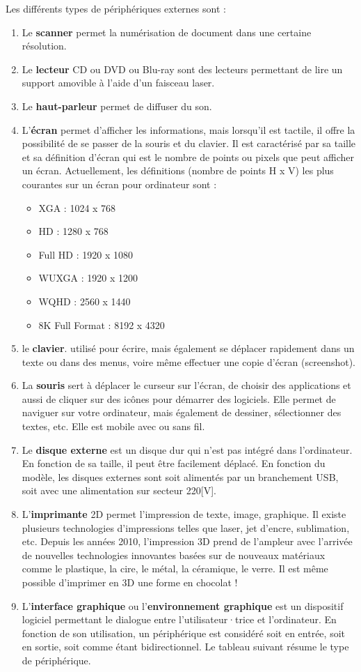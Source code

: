 \documentclass[11pt, a4paper]{book}
\begin{document}
Les différents types de périphériques externes sont :
\begin{enumerate}[1)]
    \item Le {\bf scanner} permet la numérisation de document dans une certaine résolution.
    \item Le {\bf lecteur} CD ou DVD ou Blu-ray sont des lecteurs permettant de lire un support amovible à l’aide d’un faisceau laser.
    \item Le {\bf haut-parleur} permet de diffuser du son.
    \item L’{\bf écran} permet d’afficher les informations, mais lorsqu’il est tactile, il offre la possibilité de se passer de la souris et du clavier. Il est caractérisé par sa taille et sa définition d’écran qui est le nombre de points ou pixels que peut afficher un écran. Actuellement, les définitions (nombre de points H x V) les plus courantes sur un écran pour ordinateur sont :
    	\begin{itemize}
            	\item XGA : 1024 x 768
            	\item  HD : 1280 x 768
            	\item  Full HD : 1920 x 1080
            	\item WUXGA : 1920 x 1200
            	\item  WQHD : 2560 x 1440
            	\item 8K Full Format : 8192 x 4320
           \end{itemize}
    \item le {\bf clavier}. utilisé pour écrire, mais également se déplacer rapidement dans un texte ou dans des menus, voire même effectuer une copie d’écran (screenshot).
    \item La {\bf souris} sert à déplacer le curseur sur l’écran, de choisir des applications et aussi de cliquer sur des icônes pour démarrer des logiciels. Elle permet de naviguer sur votre ordinateur, mais également de dessiner, sélectionner des textes, etc. Elle est mobile avec ou sans fil.
    \item Le {\bf disque externe} est un disque dur qui n’est pas intégré dans l’ordinateur. En fonction de sa taille, il peut être facilement déplacé. En fonction du modèle, les disques externes sont soit alimentés par un branchement USB, soit avec une alimentation sur secteur 220[V].
    \item L’{\bf imprimante} 2D permet l’impression de texte, image, graphique. Il existe plusieurs technologies d’impressions telles que laser, jet d’encre, sublimation, etc. Depuis les années 2010, l’impression 3D prend de l’ampleur avec l’arrivée de nouvelles technologies innovantes basées sur de nouveaux matériaux comme le plastique, la cire, le métal, la céramique, le verre. Il est même possible d’imprimer en 3D une forme en chocolat !
    \item L’{\bf interface graphique} ou l’{\bf environnement graphique} est un dispositif logiciel permettant le dialogue entre l’utilisateur·trice et l’ordinateur.
En fonction de son utilisation, un périphérique est considéré soit en entrée, soit en sortie, soit comme étant bidirectionnel. Le tableau suivant résume le type de périphérique.
\end{enumerate}
\end{document}
